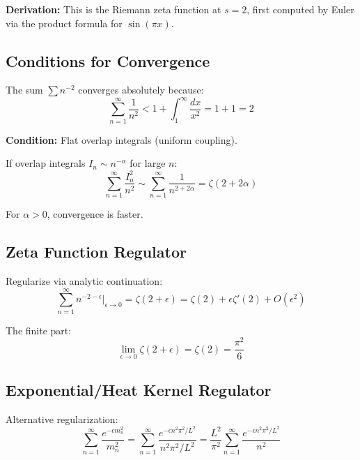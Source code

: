 \documentclass[11pt,a4paper]{article}
\begin{document}
\textbf{Derivation:} This is the Riemann zeta function at $s=2$, first computed
by Euler via the product formula for $\sin(\pi x)$.

\subsection{Conditions for Convergence}
\label{subsec:convergence-conditions}

The sum $\sum n^{-2}$ converges absolutely because:
\begin{equation}
\label{eq:convergence-test}
\sum_{n=1}^{\infty} \frac{1}{n^2} < 1 + \int_1^{\infty} \frac{dx}{x^2} = 1 + 1 = 2
\end{equation}

\textbf{Condition:} Flat overlap integrals (uniform coupling).

If overlap integrals $I_n \sim n^{-\alpha}$ for large $n$:
\begin{equation}
\label{eq:suppressed-sum}
\sum_{n=1}^{\infty} \frac{I_n^2}{n^2} \sim \sum_{n=1}^{\infty} \frac{1}{n^{2+2\alpha}} = \zeta(2+2\alpha)
\end{equation}

For $\alpha > 0$, convergence is faster.

\subsection{Zeta Function Regulator}
\label{subsec:zeta-regulator}

Regularize via analytic continuation:
\begin{equation}
\label{eq:zeta-reg}
\sum_{n=1}^{\infty} n^{-2-\epsilon} \bigg|_{\epsilon \to 0} = \zeta(2+\epsilon) = \zeta(2) + \epsilon \zeta'(2) + O(\epsilon^2)
\end{equation}

The finite part:
\begin{equation}
\label{eq:zeta-finite}
\lim_{\epsilon \to 0} \zeta(2+\epsilon) = \zeta(2) = \frac{\pi^2}{6}
\end{equation}

\subsection{Exponential/Heat Kernel Regulator}
\label{subsec:heat-kernel}

Alternative regularization:
\begin{equation}
\label{eq:heat-kernel-reg}
\sum_{n=1}^{\infty} \frac{e^{-\epsilon m_n^2}}{m_n^2} = \sum_{n=1}^{\infty} \frac{e^{-\epsilon n^2 \pi^2/L^2}}{n^2 \pi^2/L^2}
= \frac{L^2}{\pi^2} \sum_{n=1}^{\infty} \frac{e^{-\epsilon n^2 \pi^2/L^2}}{n^2}
\end{equation}
\end{document}
